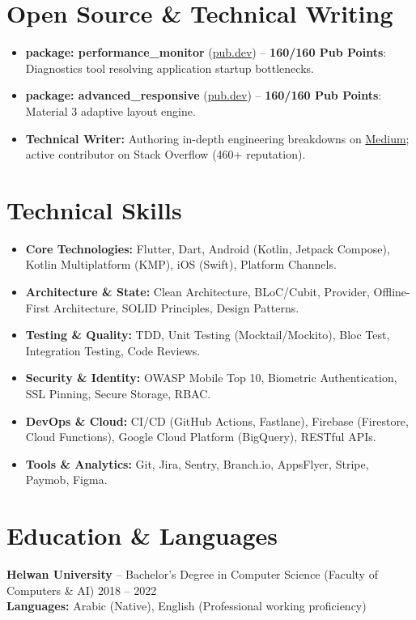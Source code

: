 \documentclass[letterpaper,10pt]{article}
\begin{document}
\section{Open Source \& Technical Writing}
\begin{itemize}
    \item \textbf{package: performance\_monitor} (\href{https://pub.dev/packages/performance_monitor}{pub.dev}) -- \textbf{160/160 Pub Points}: Diagnostics tool resolving application startup bottlenecks.
    \item \textbf{package: advanced\_responsive} (\href{https://pub.dev/packages/advanced_responsive}{pub.dev}) -- \textbf{160/160 Pub Points}: Material 3 adaptive layout engine.
    \item \textbf{Technical Writer:} Authoring in-depth engineering breakdowns on \href{https://medium.com/@sayedmoataz9}{Medium}; active contributor on Stack Overflow (460+ reputation).
\end{itemize}

\section{Technical Skills}
\begin{itemize}
    \item \textbf{Core Technologies:} Flutter, Dart, Android (Kotlin, Jetpack Compose), Kotlin Multiplatform (KMP), iOS (Swift), Platform Channels.
    \item \textbf{Architecture \& State:} Clean Architecture, BLoC/Cubit, Provider, Offline-First Architecture, SOLID Principles, Design Patterns.
    \item \textbf{Testing \& Quality:} TDD, Unit Testing (Mocktail/Mockito), Bloc Test, Integration Testing, Code Reviews.
    \item \textbf{Security \& Identity:} OWASP Mobile Top 10, Biometric Authentication, SSL Pinning, Secure Storage, RBAC.
    \item \textbf{DevOps \& Cloud:} CI/CD (GitHub Actions, Fastlane), Firebase (Firestore, Cloud Functions), Google Cloud Platform (BigQuery), RESTful APIs.
    \item \textbf{Tools \& Analytics:} Git, Jira, Sentry, Branch.io, AppsFlyer, Stripe, Paymob, Figma.
\end{itemize}

\section{Education \& Languages}
\textbf{Helwan University} -- Bachelor’s Degree in Computer Science (Faculty of Computers \& AI) \hfill 2018 -- 2022\\
\textbf{Languages:} Arabic (Native), English (Professional working proficiency)
\end{document}
